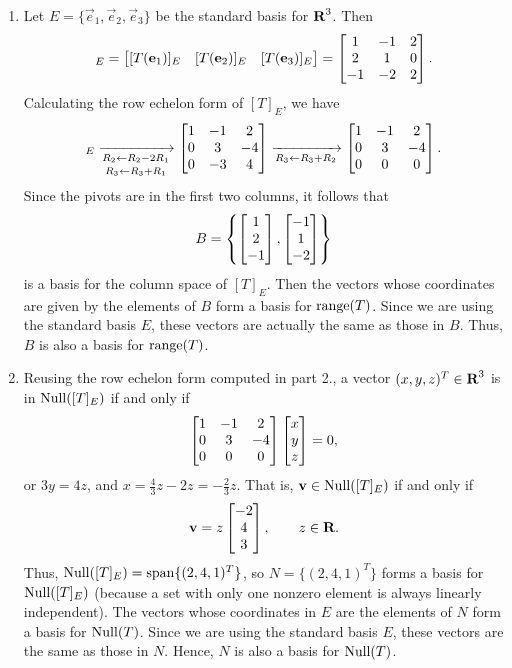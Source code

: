\documentclass{homework}
\begin{document}
\begin{enumerate}
		\item Let $E = \{\vec{e}_1, \vec{e}_2, \vec{e}_3\}$ be the standard basis for $\textnormal{\bf R}^3$. Then
		\begin{equation*}
			[T]_E = \mat{[T(\vec{e}_1)]_E & [T(\vec{e}_2)]_E & [T(\vec{e}_3)]_E} = \mat{1 & - 1 & 2 \\ 2 & 1 & 0 \\ -1 & -2 & 2}.
		\end{equation*}
		Calculating the row echelon form of $[T]_E$, we have
		\begin{equation*}
			[T]_E \xrightarrow[\substack{R_2 \gets R_2 - 2R_1 \\[0.25em] R_3 \gets R_3 + R_1}]{} \mat{1 & -1 & 2 \\ 0 & 3 & -4 \\ 0 & -3 & 4} \xrightarrow[R_3 \gets R_3 + R_2]{} \mat{1 & -1 & 2 \\ 0 & 3 & -4 \\ 0 & 0 & 0}.
		\end{equation*}
		Since the pivots are in the first two columns, it follows that
		\begin{equation*}
			B = \left\{\left[\begin{matrix}1 \\ 2 \\ -1\end{matrix}\right], \left[\begin{matrix}-1 \\ 1 \\ -2\end{matrix}\right]\right\}
		\end{equation*}
		is a basis for the column space of $[T]_E$. Then the vectors whose coordinates are given by the elements of $B$ form a basis for $\mathrm{range}(T)$. Since we are using the standard basis $E$, these vectors are actually the same as those in $B$. Thus, $B$ is also a basis for $\mathrm{range}(T)$.
		
		\item Reusing the row echelon form computed in part 2., a vector $(x,y,z)^T \in \textnormal{\bf R}^3$ is in $\mathrm{Null}([T]_E)$ if and only if 
		\begin{equation*}
			\left[\begin{matrix}1 & -1 & 2 \\ 0 & 3 & -4 \\ 0 & 0 & 0\end{matrix}\right]\left[\begin{matrix}x\\y\\z\end{matrix}\right] = 0,
		\end{equation*}
		or $3y =4z$, and $x = \frac{4}{3}z - 2z = -\frac{2}{3}z$. That is, $\mathbf{v} \in \mathrm{Null}([T]_E)$ if and only if
		\begin{equation*}
			\mathbf{v} = z\left[\begin{matrix}-2 \\ 4 \\ 3\end{matrix}\right], \qquad z \in \textnormal{\bf R}.
		\end{equation*}
		Thus, $\mathrm{Null}([T]_E) = \mathrm{span}\{(2,4,1)^T\}$, so $N = \{(2,4,1)^T\}$ forms a basis for $\mathrm{Null}([T]_E)$ (because a set with only one nonzero element is always linearly independent). The vectors whose coordinates in $E$ are the elements of $N$ form a basis for $\mathrm{Null}(T)$. Since we are using the standard basis $E$, these vectors are the same as those in $N$. Hence, $N$ is also a basis for $\mathrm{Null}(T)$.
	\end{enumerate}
	
\end{document}
